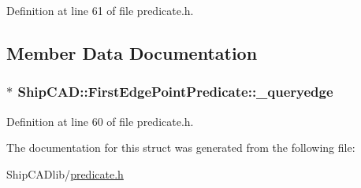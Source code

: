 Definition at line 61 of file predicate.\+h.



\subsection{Member Data Documentation}
\subsubsection[{\texorpdfstring{\+\_\+queryedge}{_queryedge}}]{$\ast$ Ship\+C\+A\+D\+::\+First\+Edge\+Point\+Predicate\+::\+\_\+queryedge}\hypertarget{structShipCAD_1_1FirstEdgePointPredicate_a742e86c0109e10e3fe5482066fc31dc5}{}\label{structShipCAD_1_1FirstEdgePointPredicate_a742e86c0109e10e3fe5482066fc31dc5}


Definition at line 60 of file predicate.\+h.



The documentation for this struct was generated from the following file\+:\begin{DoxyCompactItemize}
\item 
Ship\+C\+A\+Dlib/\hyperlink{predicate_8h}{predicate.\+h}\end{DoxyCompactItemize}
